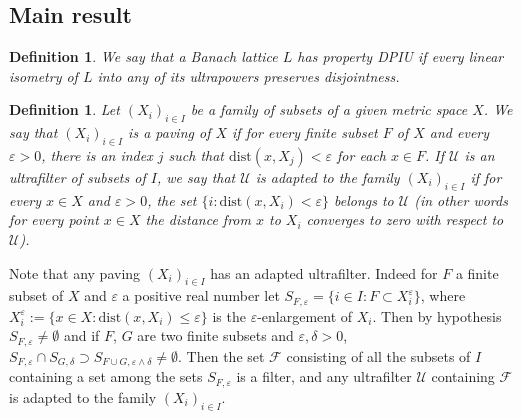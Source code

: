 \documentclass[11pt]{amsart}
\theoremstyle{plain}
\newtheorem{definition}[theorem]{Definition}
\theoremstyle{remark}
\newcommand{\U}{\mathcal U}
\newcommand{\eps}{\varepsilon}
\begin{document}
\subsection{Main result}\label{subsec:MainResult}

\begin{definition}\label{DPI}
We say that a Banach lattice $L$ has property DPIU if every linear isometry of $L$ into any of its ultrapowers preserves disjointness.
\end{definition}

\begin{definition} Let $(X_i)_{i\in I}$ be a family of subsets of a given metric space $X$. We say that $(X_i)_{i\in I}$ is a paving of $X$ if for every finite subset $F$ of $X$ and every $\eps>0$, there is an index $j$ such that $\mathrm{dist} (x,X_j)<\eps$ for each $x\in F$. If $\U$ is an ultrafilter of subsets of $I$, we say that $\U$ is adapted to the family $(X_i)_{i\in I}$ if for every $x\in X$ and $\eps>0$, the set $\{i: \mathrm{dist} (x,X_i)<\eps\}$ belongs to $\mathcal U$ (in other words for every point $x\in X$ the distance from $x$ to $X_i$ converges to zero with respect to $\U$).
\end{definition}

Note that any paving $(X_i)_{i\in I}$ has an adapted ultrafilter.
 Indeed for $F$ a finite subset of  $X$ and $\eps$ a positive real number let $S_{F,\eps}=\{i\in I: F\subset X_i^\eps\}$, where $X_i^\eps:=\{x\in X: \mathrm{dist}(x,X_i)\le\eps\}$ is the $\eps$-enlargement of $X_i$. Then by hypothesis $S_{F,\eps}\ne\emptyset$ and if $F$, $G$ are two finite subsets and $\eps,\delta>0$,  $S_{F,\eps}\cap S_{G,\delta}\supset S_{F\cup G,\eps\wedge \delta}\ne\emptyset$. Then the set $\mathcal F$ consisting of all the subsets of $I$ containing a set among the sets $S_{F,\eps}$ is a filter, and any ultrafilter $\U$ containing $\mathcal F$ is adapted to the family $(X_i)_{i\in I}$. 
\end{document}
